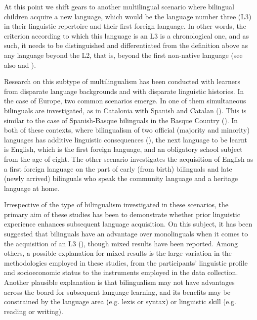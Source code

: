 \documentclass[output=paper,colorlinks,citecolor=brown,nonflat]{../langscibook}
\begin{document}
At this point we shift gears to another multilingual scenario where bilingual children acquire a new language, which would be the language number three (L3) in their linguistic repertoire and their first foreign language. In other words, the criterion according to which this language is an L3 is a chronological one, and as such, it needs to be distinguished and differentiated from the definition above as any language beyond the L2, that is, beyond the first non-native language (see also  and ).

Research on this subtype of multilingualism has been conducted with learners from disparate language backgrounds and with disparate linguistic histories. In the case of Europe, two common scenarios emerge. In one of them simultaneous bilinguals are investigated, as in Catalonia with Spanish and Catalan (\citealt{Muñoz2000, Muñoz2000}). This is similar to the case of Spanish-Basque bilinguals in the Basque Country (\citealt{García-MayoGarcía-Lecumberri2003}). In both of these contexts, where bilingualism of two official (majority and minority) languages has additive linguistic consequences (\citealt{CenozValencia1994, Sanz2000}), the next language to be learnt is English, which is the first foreign language, and an obligatory school subject from the age of eight. The other scenario investigates the acquisition of English as a first foreign language on the part of early (from birth) bilinguals and late (newly arrived) bilinguals who speak the community language and a heritage language at home.

Irrespective of the type of bilingualism investigated in these scenarios, the primary aim of these studies has been to demonstrate whether prior linguistic experience enhances subsequent language acquisition. On this subject, it has been suggested that bilinguals have an advantage over monolinguals when it comes to the acquisition of an L3 (\citealt{Sanz2000, Cenoz2003, Cenoz2013, Kopečková2016, HiroshiDegani2018}), though mixed results have been reported. Among others, a possible explanation for mixed results is the large variation in the methodologies employed in these studies, from the participants’ linguistic profile and socioeconomic status to the instruments employed in the data collection. Another plausible explanation is that bilingualism may not have advantages across the board for subsequent language learning, and its benefits may be constrained by the language area (e.g. lexis or syntax) or linguistic skill (e.g. reading or writing).
\end{document}
